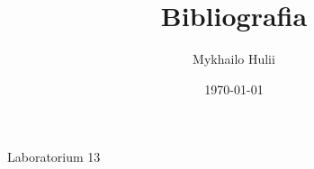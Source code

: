 \documentclass[a4paper,8pt]{article}
\author{Mykhailo Hulii}
\date{\today}
\title{Bibliografia}
\begin{document}
	\maketitle
	Laboratorium 13
	
	\nocite{DBLP:conf/tacas/AbdullaBE00}
	\nocite{DBLP:journals/jsat/Biere08}
	\nocite{DBLP:conf/dac/BiereCCFZ99}
	\nocite{DBLP:conf/tacas/BiereCCZ99}
	\nocite{DBLP:journals/corr/abs-cs-0611029}
	\nocite{DBLP:conf/cav/BordiniFPVW03}
	\nocite{DBLP:journals/logcom/BordiniFWV09}
	\nocite{DBLP:conf/atal/BullingJ10}
	\nocite{DBLP:conf/dac/CabodiCQ02}
	\nocite{DBLP:journals/joc/Chaum88}
	\nocite{DBLP:conf/cav/ClarkeGH94}
	\nocite{DBLP:books/daglib/0007403-2}
	\nocite{DBLP:conf/cav/CoptyFFGKTV01}
	\nocite{DBLP:journals/ase/DennisFWB12}
	\nocite{DBLP:conf/concur/EtessamiH00}
	\nocite{DBLP:books/mit/FHMV1995}
	\nocite{DBLP:conf/cav/GammieM04}
	
	
	
\end{document}
